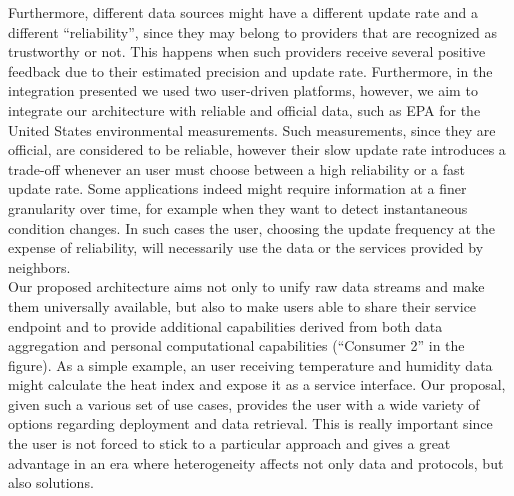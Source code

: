 Furthermore, different data sources might have a different update rate and a different ``reliability'', since they may belong to providers that are recognized as trustworthy or not.
This happens when such providers receive several positive feedback due to their estimated precision and update rate.
Furthermore, in the integration presented we used two user-driven platforms, however, we aim to integrate our architecture with reliable and official data, such as EPA for the United States environmental measurements.
Such measurements, since they are official, are considered to be reliable, however their slow update rate introduces a trade-off whenever an user must choose between a high reliability or a fast update rate.
Some applications indeed might require information at a finer granularity over time, for example when they want to detect instantaneous condition changes.
In such cases the user, choosing the update frequency at the expense of reliability, will necessarily use the data or the services provided by neighbors.
\\
Our proposed architecture aims not only to unify raw data streams and make them universally available, but also to make users able to share their service endpoint and to provide additional capabilities derived from both data aggregation and personal computational capabilities (``Consumer 2'' in the figure).
As a simple example, an user receiving temperature and humidity data might calculate the heat index and expose it as a service interface. Our proposal, given such a various set of use cases, provides the user with a wide variety of options regarding deployment and data retrieval.
This is really important since the user is not forced to stick to a particular approach and gives a great advantage in an era where heterogeneity affects not only data and protocols, but also solutions.